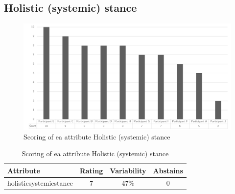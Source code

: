 \subsection{Holistic (systemic) stance}
\begin{figure}[H]
	\centering
	\includegraphics[width=0.9\linewidth]{images/scoreeaholisticsystemsstance}
	\caption[Scoring of \gls{ea} attribute Holistic (systemic) stance]{Scoring of \gls{ea} attribute Holistic (systemic) stance}
	\label{fig:appscoringeaholisticsystemsstance}
\end{figure}
\begin{table}[H]
	\centering
	\begin{tabular}{p{}ccc}
		\toprule
		\textbf{Attribute} & \textbf{Rating} & \textbf{Variability} & \textbf{Abstains} \\
		\midrule
		\Gls{holisticsystemicstance} & 7 & 47\% & 0 \\%
		\bottomrule
	\end{tabular}%
	\caption[Scoring of \gls{ea} attribute Holistic (systemic) stance]{Scoring of \gls{ea} attribute Holistic (systemic) stance}
	\label{tab:appscoringeaholisticsystemsstance}%
\end{table}%
\newpage
